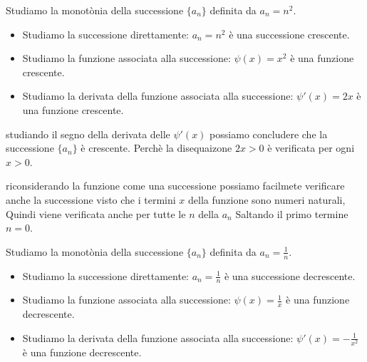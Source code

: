    \begin{esempio}
        Studiamo la monotònia della successione $\{a_n\}$ definita da $a_n = n^2$.
        \begin{itemize}
            \item Studiamo la successione direttamente: $a_n = n^2$ è una successione crescente.
            \item Studiamo la funzione associata alla successione: $\psi(x) = x^2$ è una funzione crescente.
            \item Studiamo la derivata della funzione associata alla successione: $\psi'(x) = 2x$ è una funzione crescente.
        \end{itemize}
        studiando il segno della derivata delle $\psi'(x)$ possiamo concludere che la successione $\{a_n\}$ è crescente. Perchè la disequaizone $2x > 0$ è verificata per ogni $x > 0$.
            \begin{approfondimento}
                riconsiderando la funzione come una successione possiamo facilmete verificare anche la successione visto che i termini $x$ della funzione sono numeri naturali, Quindi viene verificata anche per tutte le $n$ della $a_n$ Saltando il primo termine $n=0$.
            \end{approfondimento}
    \end{esempio}
    \begin{esempio}
        Studiamo la monotònia della successione $\{a_n\}$ definita da $a_n = \frac{1}{n}$.
        \begin{itemize}
            \item Studiamo la successione direttamente: $a_n = \frac{1}{n}$ è una successione decrescente.
            \item Studiamo la funzione associata alla successione: $\psi(x) = \frac{1}{x}$ è una funzione decrescente.
            \item Studiamo la derivata della funzione associata alla successione: $\psi'(x) = -\frac{1}{x^2}$ è una funzione decrescente.
        \end{itemize}
    \end{esempio}